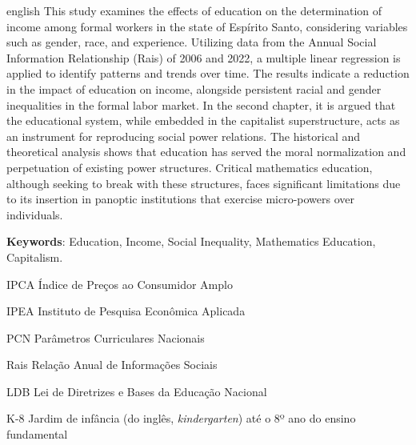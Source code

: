 \begin{resumo}[Abstract]
  \begin{otherlanguage*}{english}
    This study examines the effects of education on the determination of income among formal workers in the state of Espírito Santo, considering variables such as gender, race, and experience. Utilizing data from the Annual Social Information Relationship (Rais) of 2006 and 2022, a multiple linear regression is applied to identify patterns and trends over time. The results indicate a reduction in the impact of education on income, alongside persistent racial and gender inequalities in the formal labor market. In the second chapter, it is argued that the educational system, while embedded in the capitalist superstructure, acts as an instrument for reproducing social power relations. The historical and theoretical analysis shows that education has served the moral normalization and perpetuation of existing power structures. Critical mathematics education, although seeking to break with these structures, faces significant limitations due to its insertion in panoptic institutions that exercise micro-powers over individuals.

    \textbf{Keywords}: Education, Income, Social Inequality, Mathematics Education, Capitalism.
  \end{otherlanguage*}
\end{resumo}

\listoffigures*
\cleardoublepage


\listoftables*
\cleardoublepage

\begin{siglas}
  \item[IPCA] Índice de Preços ao Consumidor Amplo
  \item[IPEA] Instituto de Pesquisa Econômica Aplicada
  \item[PCN] Parâmetros Curriculares Nacionais
  \item[Rais] Relação Anual de Informações Sociais
  \item[LDB] Lei de Diretrizes e Bases da Educação Nacional
  \item[K-8] Jardim de infância (do inglês, \textit{kindergarten}) até o 8º ano do ensino fundamental
\end{siglas}

